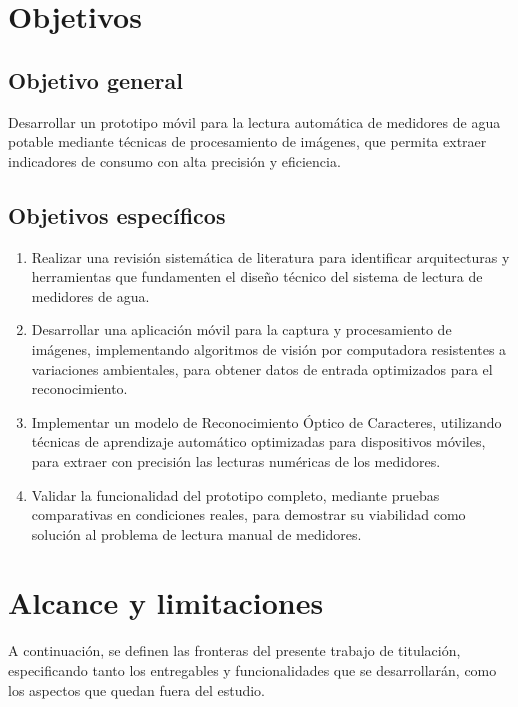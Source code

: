 \section{Objetivos}
\label{sec:objectives}

\subsection{Objetivo general}
\label{subsec:general_objective}
Desarrollar un prototipo móvil para la lectura automática de medidores de agua potable mediante técnicas de procesamiento de imágenes, que permita extraer indicadores de consumo con alta precisión y eficiencia.

\subsection{Objetivos específicos}
\label{subsec:specific_objectives}

\begin{enumerate}
    \item Realizar una revisión sistemática de literatura para identificar arquitecturas y herramientas que fundamenten el diseño técnico del sistema de lectura de medidores de agua.
    \item Desarrollar una aplicación móvil para la captura y procesamiento de imágenes, implementando algoritmos de visión por computadora resistentes a variaciones ambientales, para obtener datos de entrada optimizados para el reconocimiento.
    \item Implementar un modelo de Reconocimiento Óptico de Caracteres, utilizando técnicas de aprendizaje automático optimizadas para dispositivos móviles, para extraer con precisión las lecturas numéricas de los medidores.
    \item Validar la funcionalidad del prototipo completo, mediante pruebas comparativas en condiciones reales, para demostrar su viabilidad como solución al problema de lectura manual de medidores.
\end{enumerate}

\section{Alcance y limitaciones}
\label{sec:scope_limitations}

A continuación, se definen las fronteras del presente trabajo de titulación, especificando tanto los entregables y funcionalidades que se desarrollarán, como los aspectos que quedan fuera del estudio.

